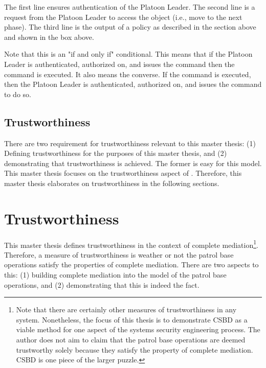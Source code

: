 \documentclass[../../main/main.tex]{subfiles}
\begin{document}

The first line ensures authentication of the Platoon Leader.  The second line is a request from the Platoon Leader to access the object (i.e., move to the next phase).  The third line is the output of a policy as described in the section above and shown in the box above. 

Note that this is an "if and only if" conditional.  This means that if the Platoon Leader is authenticated, authorized on, and issues the command then the command is executed.  It also means the converse.  If the command is executed, then the Platoon Leader is authenticated, authorized on, and issues the command to do so.  

\subsection{Trustworthiness}


There are two requirement for trustworthiness relevant to this master thesis: (1) Defining trustworthiness for the purposes of this master thesis, and (2) demonstrating that trustworthiness is achieved.  The former is easy for this model.  This master thesis focuses on the trustworthiness aspect of .  Therefore, this master thesis elaborates on trustworthiness in the following sections.

\section{Trustworthiness}\label{sssec:trustworthiness}
This master thesis defines trustworthiness in the context of complete mediation\footnote{Note that there are certainly other measures of trustworthiness in any system.  Nonetheless, the focus of this thesis is to demonstrate CSBD as a viable method for one aspect of the systems security engineering process.  The author does not aim to claim that the patrol base operations are deemed trustworthy solely because they satisfy the property of complete mediation.  CSBD is one piece of the larger puzzle.}.  Therefore, a measure of trustworthiness is weather or not the patrol base operations satisfy the properties of complete mediation.  There are two aspects to this: (1) building complete mediation into the model of the patrol base operations, and (2) demonstrating that this is indeed the fact.  
\end{document}
